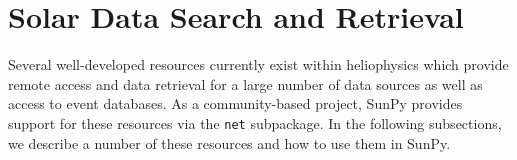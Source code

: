 \section{Solar Data Search and Retrieval}\label{sec:retrieval}

Several well-developed resources currently exist within heliophysics which provide  
remote access and data retrieval for a large number of data sources as well as access to 
event databases. As a community-based project, 
SunPy provides support for these resources via the \texttt{net} subpackage. 
In the following subsections, we describe a number of these resources and 
how to use them in SunPy.






